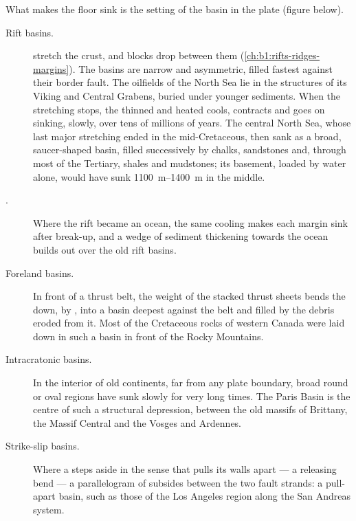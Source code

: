 What makes the floor sink is the setting of the basin in the plate (figure
below).

\begin{description}
  \item[Rift basins.]  stretch the crust, and blocks drop between
        them (\cref{ch:b1:rifts-ridges-margins}). The basins are narrow and
        asymmetric,  filled fastest against their border fault. The
        oilfields of the North Sea lie in the structures of its Viking and
        Central Grabens, buried under younger sediments. When the stretching
        stops, the thinned and heated  cools, contracts and goes on
        sinking, slowly, over tens of millions of years. The central North Sea,
        whose last major stretching ended in the mid-Cretaceous, then sank as a
        broad, saucer-shaped basin, filled successively by chalks, sandstones
        and, through most of the Tertiary, shales and mudstones; its basement,
        loaded by water alone, would have sunk \qtyrange{1100}{1400}{m} in the
        middle.
  \item[.] Where the rift became an ocean, the same cooling
        makes each margin sink after break-up, and a wedge of sediment
        thickening towards the ocean builds out over the old rift basins.
  \item[Foreland basins.] In front of a thrust belt, the weight of the stacked
        thrust sheets bends the  down, by , into a basin
        deepest against the belt and filled by the debris eroded from it. Most
        of the Cretaceous rocks of western Canada were laid down in such a basin
        in front of the Rocky Mountains.
  \item[Intracratonic basins.] In the interior of old continents, far from any
        plate boundary, broad round or oval regions have sunk slowly for very
        long times. The Paris Basin is the centre of such a structural
        depression, between the old massifs of Brittany, the Massif Central and
        the Vosges and Ardennes.
  \item[Strike-slip basins.] Where a  steps aside in the
        sense that pulls its walls apart --- a releasing bend --- a parallelogram
        of  subsides between the two fault strands: a pull-apart basin, such
        as those of the Los Angeles region along the San Andreas system.
\end{description}

